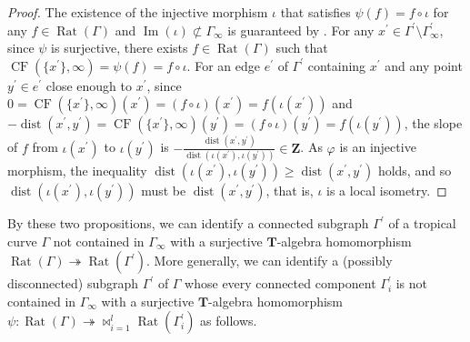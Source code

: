 \documentclass[a4paper,12pt]{amsart}
\def\Gamma{\varGamma}
\begin{document}
\begin{proof}
The existence of the injective morphism $\iota$ that satisfies $\psi(f) = f \circ \iota$ for any $f \in \operatorname{Rat}(\Gamma)$ and $\operatorname{Im}(\iota) \not\subset \Gamma_{\infty}$ is guaranteed by \cite[Proposition~3.11 and Theorem~3.14]{JuAe4}.
For any $x^{\prime} \in \Gamma^{\prime} \setminus \Gamma^{\prime}_{\infty}$, since $\psi$ is surjective, there exists $f \in \operatorname{Rat}(\Gamma)$ such that $\operatorname{CF}(\{ x^{\prime} \}, \infty) = \psi(f) = f \circ \iota$.
For an edge $e^{\prime}$ of $\Gamma^{\prime}$ containing $x^{\prime}$ and any point $y^{\prime} \in e^{\prime}$ close enough to $x^{\prime}$, since $0 = \operatorname{CF}(\{ x^{\prime} \}, \infty)(x^{\prime}) = (f \circ \iota)(x^{\prime}) = f(\iota(x^{\prime}))$ and $- \operatorname{dist}(x^{\prime}, y^{\prime}) = \operatorname{CF}(\{ x^{\prime} \}, \infty)(y^{\prime}) = (f \circ \iota)(y^{\prime}) = f(\iota(y^{\prime}))$, the slope of $f$ from $\iota(x^{\prime})$ to $\iota(y^{\prime})$ is $- \frac{\operatorname{dist}(x^{\prime}, y^{\prime})}{\operatorname{dist}(\iota(x^{\prime}), \iota(y^{\prime}))} \in \boldsymbol{Z}$.
As $\varphi$ is an injective morphism, the inequality $\operatorname{dist}(\iota(x^{\prime}), \iota(y^{\prime})) \ge \operatorname{dist}(x^{\prime}, y^{\prime})$ holds, and so $\operatorname{dist}(\iota(x^{\prime}), \iota(y^{\prime}))$ must be $\operatorname{dist}(x^{\prime}, y^{\prime})$, that is, $\iota$ is a local isometry.
\end{proof}

By these two propositions, we can identify a connected subgraph $\Gamma^{\prime}$ of a tropical curve $\Gamma$ not contained in $\Gamma_{\infty}$ with a surjective $\boldsymbol{T}$-algebra homomorphism $\operatorname{Rat}(\Gamma) \twoheadrightarrow \operatorname{Rat}(\Gamma^{\prime})$.
More generally, we can identify a (possibly disconnected) subgraph $\Gamma^{\prime}$ of $\Gamma$ whose every connected component $\Gamma_i^{\prime}$ is not contained in $\Gamma_{\infty}$ with a surjective $\boldsymbol{T}$-algebra homomorphism $\psi : \operatorname{Rat}(\Gamma) \twoheadrightarrow \bowtie_{i = 1}^l \operatorname{Rat}(\Gamma_i^{\prime})$ as follows.
\end{document}
